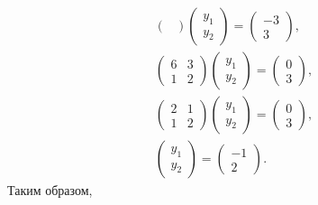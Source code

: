 \documentclass[12pt]{article}
\begin{document}
\begin{gather*}
\begin{pmatrix}
        \end{pmatrix}
        \begin{pmatrix}
            y_1 \\
            y_2
        \end{pmatrix}
        =
        \begin{pmatrix}
            -3 \\
            3
        \end{pmatrix}, \\
        \begin{pmatrix}
            6 & 3 \\
            1 & 2
        \end{pmatrix}
        \begin{pmatrix}
            y_1 \\
            y_2
        \end{pmatrix}
        =
        \begin{pmatrix}
            0 \\
            3
        \end{pmatrix}, \\
        \begin{pmatrix}
            2 & 1 \\
            1 & 2
        \end{pmatrix}
        \begin{pmatrix}
            y_1 \\
            y_2
        \end{pmatrix}
        =
        \begin{pmatrix}
            0 \\
            3
        \end{pmatrix}, \\
        \begin{pmatrix}
            y_1 \\
            y_2
        \end{pmatrix}
        =
        \begin{pmatrix}
            -1 \\
            2
        \end{pmatrix}.
    \end{gather*}
    Таким образом,
\end{document}
